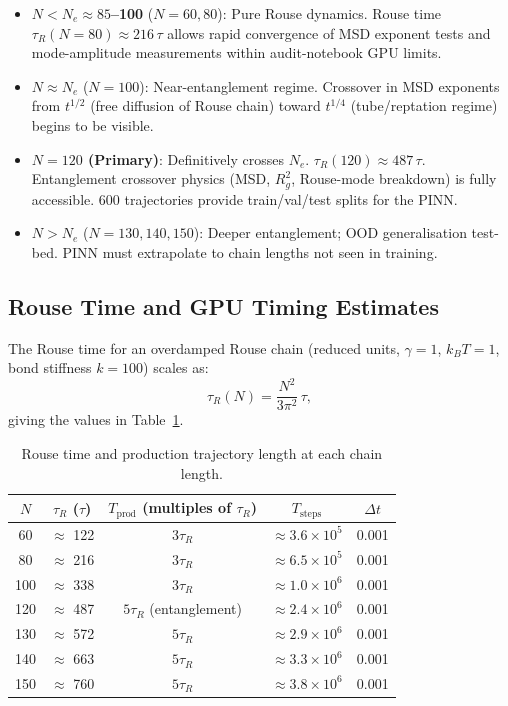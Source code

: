 \documentclass[12pt,a4paper]{article}
\begin{document}
\begin{itemize}
  \item \textbf{$N < N_e \approx 85$--100} ($N = 60, 80$): Pure Rouse dynamics.
        Rouse time $\tau_R(N=80) \approx 216\,\tau$ allows rapid convergence of
        MSD exponent tests and mode-amplitude measurements within audit-notebook
        GPU limits.
  \item \textbf{$N \approx N_e$} ($N = 100$): Near-entanglement regime.
        Crossover in MSD exponents from $t^{1/2}$ (free diffusion of Rouse
        chain) toward $t^{1/4}$ (tube/reptation regime) begins to be visible.
  \item \textbf{$N = 120$ (Primary)}: Definitively crosses $N_e$.
        $\tau_R(120) \approx 487\,\tau$. Entanglement crossover physics (MSD,
        $R_g^2$, Rouse-mode breakdown) is fully accessible.  600 trajectories
        provide train/val/test splits for the PINN.
  \item \textbf{$N > N_e$} ($N = 130, 140, 150$): Deeper entanglement; OOD
        generalisation test-bed.  PINN must extrapolate to chain lengths not
        seen in training.
\end{itemize}

\subsection{Rouse Time and GPU Timing Estimates}

The Rouse time for an overdamped Rouse chain (reduced units, $\gamma=1$,
$k_BT=1$, bond stiffness $k=100$) scales as:
\begin{equation}
  \tau_R(N) = \frac{N^2}{3\pi^2}\,\tau,
  \label{eq:tauR}
\end{equation}
giving the values in Table~\ref{tab:tauR}.

\begin{table}[h]
\centering
\caption{Rouse time and production trajectory length at each chain length.}
\label{tab:tauR}
\begin{tabular}{ccccc}
\toprule
$N$ & $\tau_R$ ($\tau$) & $T_\text{prod}$ (multiples of $\tau_R$) & $T_\text{steps}$ & $\Delta t$ \\
\midrule
 60 & $\approx$ 122 & $3\tau_R$ & $\approx 3.6\times10^5$ & 0.001 \\
 80 & $\approx$ 216 & $3\tau_R$ & $\approx 6.5\times10^5$ & 0.001 \\
100 & $\approx$ 338 & $3\tau_R$ & $\approx 1.0\times10^6$ & 0.001 \\
120 & $\approx$ 487 & $5\tau_R$ (entanglement) & $\approx 2.4\times10^6$ & 0.001 \\
130 & $\approx$ 572 & $5\tau_R$ & $\approx 2.9\times10^6$ & 0.001 \\
140 & $\approx$ 663 & $5\tau_R$ & $\approx 3.3\times10^6$ & 0.001 \\
150 & $\approx$ 760 & $5\tau_R$ & $\approx 3.8\times10^6$ & 0.001 \\
\bottomrule
\end{tabular}
\end{table}
\end{document}

